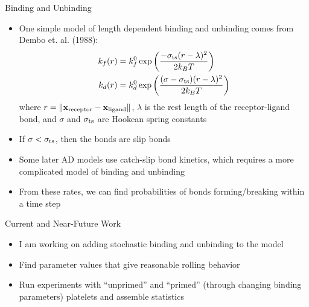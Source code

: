 \documentclass[10pt]{beamer}
\newcommand{\vect}[1]{\boldsymbol{\mathbf{#1}}}
\newcommand{\tn}{\textnormal}
\begin{document}
\begin{frame}{Binding and Unbinding}
  \begin{itemize}
  \item One simple model of length dependent binding and unbinding
    comes from Dembo et. al. (1988):
    \begin{align*}
      k_f(r) &= k_f^0 \exp \left(\frac{-\sigma_\tn{ts} (r -
               \lambda)^2}{2k_B T} \right) \\
      k_d(r) &= k_d^0 \exp \left(\frac{(\sigma - \sigma_\tn{ts})(r -
               \lambda)^2}{2k_B T} \right) \\
    \end{align*}
    where $r = \| \vect{x}_\tn{receptor} - \vect{x}_\tn{ligand}
    \|$, $\lambda$ is the rest length of the receptor-ligand bond, and
    $\sigma$ and $\sigma_\tn{ts}$ are Hookean spring constants
  \item If $\sigma < \sigma_\tn{ts}$, then the bonds are slip bonds
  \item Some later AD models use catch-slip bond kinetics, which
    requires a more complicated model of binding and unbinding
  \item From these rates, we can find probabilities of bonds
    forming/breaking within a time step
  \end{itemize}
\end{frame}

\begin{frame}{Current and Near-Future Work}
  \begin{itemize}
  \item I am working on adding stochastic binding and unbinding to the
    model
  \item Find parameter values that give reasonable rolling behavior
  \item Run experiments with ``unprimed'' and ``primed'' (through
    changing binding parameters) platelets and assemble statistics
  \end{itemize}
\end{frame}
\end{document}
